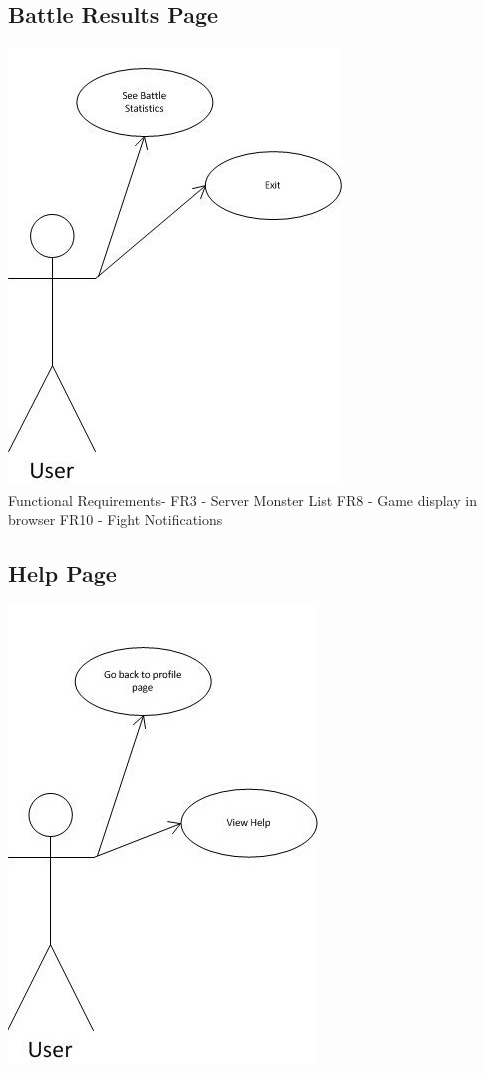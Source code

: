 \documentclass{project}
\begin{document}
\newpage
\subsection{Battle Results Page}
\includegraphics[scale=0.6]{BattleResultsPageUseCase.jpg}
\\
Functional Requirements-
FR3 - Server Monster List
FR8 - Game display in browser
FR10 - Fight Notifications

\newpage
\subsection{Help Page}
\includegraphics[scale=0.6]{HelpPageUseCase.jpg}
\end{document}
